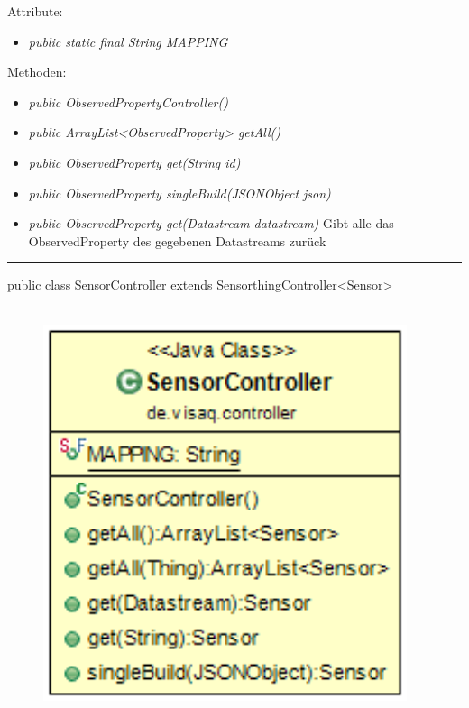 Attribute:
\begin{itemize}
    \item \emph{public static final String MAPPING} \mappingDescription
\end{itemize}
Methoden:
\begin{itemize}
    \item \emph{public ObservedPropertyController()}
    \item \emph{public ArrayList<ObservedProperty> getAll()}
    \extendsSensorthingController
    \item \emph{public ObservedProperty get(String id)}
    \extendsSensorthingController
    \item \emph{public ObservedProperty singleBuild(JSONObject json)}
    \extendsSensorthingController
    \item \emph{public ObservedProperty get(Datastream datastream)}
    Gibt alle das ObservedProperty des gegebenen Datastreams zurück
\end{itemize}
\clearpage %
\rule{\textwidth}{0.4pt}
public class SensorController extends SensorthingController<Sensor>
\\\\
\begin{minipage}{0.3\textwidth}
    \begin{figure}[H]
        {\centering\includegraphics[width=0.95\textwidth]{media/backend/controller/classes/SensorController.png}}
    \end{figure}
    \end{minipage} \hfill
\begin{minipage}{0.7\textwidth}
\end{minipage}

